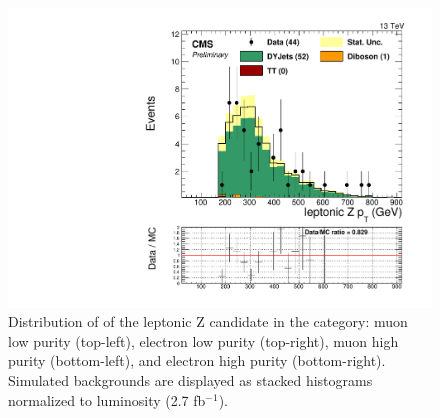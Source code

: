 \begin{figure}[h]
\begin{center}
\includegraphics[scale=0.37]{figures/control/ptZllEHP.pdf}
\caption[Distribution of \ptrans of the leptonic Z candidate]{Distribution of \ptrans of the leptonic Z candidate in the category: muon low purity (top-left), electron low purity (top-right), muon high purity (bottom-left), and  electron high purity (bottom-right). Simulated backgrounds are displayed as stacked histograms normalized to luminosity (2.7 fb$^{-1}$).}
\label{ptZll_VZ}
\end{center}
\end{figure}
